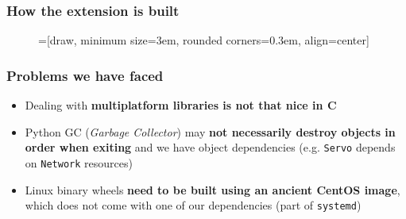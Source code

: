 \documentclass{beamer}
\begin{document}
\begin{frame}
  \frametitle{How the extension is built}

  \begin{figure}
    \centering
    =[draw, minimum size=3em, rounded corners=0.3em, align=center]

  \end{figure}
\end{frame}

\begin{frame}
  \frametitle{Problems we have faced}

  \begin{itemize}
    \item<1-> Dealing with \textbf{multiplatform libraries is not that nice in
      C}
    \item<2-> Python GC (\textit{Garbage Collector}) may \textbf{not necessarily
      destroy objects in order when exiting} and we have object dependencies
      (e.g. \texttt{Servo} depends on \texttt{Network} resources)
    \item<3-> Linux binary wheels \textbf{need to be built using an ancient
      CentOS image}, which does not come with one of our dependencies (part of
      \texttt{systemd})
  \end{itemize}
\end{frame}
\end{document}
